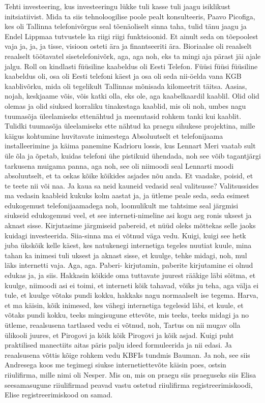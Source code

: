 Tehti investeering, kus investeeringu lükke tuli kasse tuli jaagu isiklikust initsiatiivist. Mida ta siis tehnoloogilise poole pealt konsulteeris, Paavo Picofiga, kes oli Tallinna telefonivõrgus seal tõenäoliselt sinna taha, tulid tänu jaagu ja Endel Lippmaa tutvustele ka riigi riigi funktsioonid. Et ainult seda on tõepoolest vaja ja, ja, ja tisse, visioon osteti ära ja finantseeriti ära. Bioriaalse oli reaalselt reaalselt töötavatel sisetelefonivõrk, aga, aga noh, eks ta mingi aja pärast jäi ajale jalgu.
Roll on kindlasti füüsiline kaabeldus oli Eesti Telefon.
Füüsi füüsi füüsiline kaabeldus oli, osa oli Eesti telefoni käest ja osa oli seda nii-öelda vana KGB kaablivõrku, mida oli tegelikult Tallinnas mõnisada kilomeetrit täitsa.
Aasias, nojah, keskjaame võis, võis katki olla, eks ole, aga kaabelkaardil kaablil.
Olid olid olemas ja olid siuksed korraliku tinakestaga kaablid, mis oli noh, umbes nagu tuumasõja üleelamiseks ettenähtud ja meenutasid rohkem tanki kui kaablit.
Tulidki tuumasõja üleelamiseks ette nähtud ka praegu sihukese projektina, mille käigus kohtumine huvitavate inimestega
Absoluutselt et telefonijaama installeerimine ja käima panemine Kadrioru lossis, kus Lennart Meri vaatab sult üle õla ja õpetab, kuidas telefoni ühe pistikuid ühendada, noh see võib tagantjärgi tarkusena muigama panna, aga noh, see oli niimoodi seal Lennarti moodi absoluutselt, et ta oskas kõike kõikides asjades nõu anda. Et vaadake, poisid, et te teete nii või naa.
Ja kaua sa neid kauneid vedasid seal valitsusse?
Valitsussides ma vedasin kaableid kukuks kolm aastat ja, ja ütleme peale seda, seda esimest edukogemust telefonijaamadega noh, loomulikult me tahtsime seal järgmisi siukseid edukogemusi veel, et see interneti-nimeline asi kogu aeg ronis uksest ja aknast sisse. Kirjutasime järgmiseid pabereid, et nüüd oleks mõttekas selle jaoks kuidagi investeerida. Siia-sinna ma ei võtnud väga vedu. Kuigi, kuigi see hetk juba ükskõik kelle käest, kes natukenegi internetiga tegeles nuutiat kuule, mina tahan ka inimesi tuli uksest ja aknast sisse, et kuulge, tehke midagi, noh, mul läks internetti vaja. Aga, aga.
Paberi- kirjutamin, paberite kirjutamine ei olnud edukas ja, ja siis.
Hakkasin kõikide oma tuttavate juurest rääkige läbi sõitma, et kuulge, niimoodi asi ei toimi, et interneti kõik tahavad, võiks ju teha, aga välja ei tule, et kuulge võtaks pundi kokku, hakkaks nagu normaalselt ise tegema.
Harva, et ma käisin, kõik inimesed, kes vähegi internetiga tegelesid läbi, et kuule, et võtaks pundi kokku, teeks mingisugune ettevõte, mis teeks, teeks midagi ja no ütleme, reaalsusena tartlased vedu ei võtnud, noh, Tartus on nii mugav olla ülikooli juures, et Pirogovi ja kõik kõik Pirogovi ja kõik asjad. Kuigi puht praktilised manectiits aitas päris palju ideed formuleerida ja nii edasi. Ja reaalsusena võttis kõige rohkem vedu KBFIs tundmis Bauman. Ja noh, see siis Andresega koos me tegimegi siukse internetiettevõte käisin poes, ostsin riiulifirma, mille nimi oli Nesper. Mis on, mis on praegu siis praeguseks siis Elisa seesamasugune riiulifirmad peavad vastu ostetud riiulifirma registreerimiskoodi, Elise registreerimiskood on samad.
